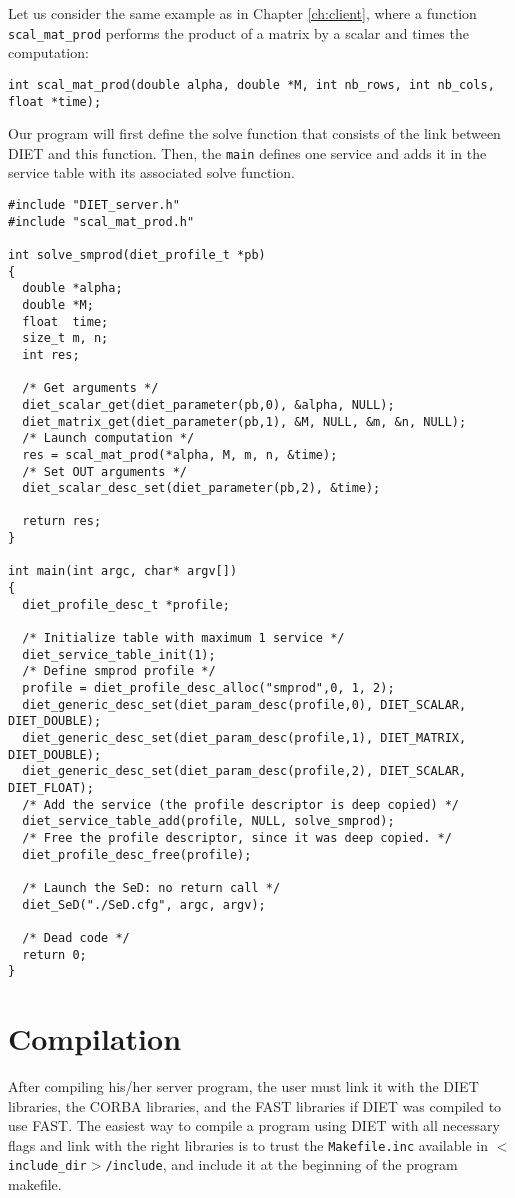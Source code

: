 {{Let us consider the same example as in Chapter \ref{ch:client}, where
a function \texttt{scal\_mat\_prod} performs the product of a matrix
by a scalar and times the computation: {\footnotesize
\begin{verbatim}
int scal_mat_prod(double alpha, double *M, int nb_rows, int nb_cols, float *time);
\end{verbatim}
}
Our program will first define the solve function that consists of the link
between DIET and this function. Then, the \texttt{main} defines one service and
adds it in the service table with its associated solve function.
{\footnotesize
\begin{verbatim}
#include "DIET_server.h"
#include "scal_mat_prod.h"

int solve_smprod(diet_profile_t *pb)
{
  double *alpha;
  double *M;
  float  time;
  size_t m, n;
  int res;

  /* Get arguments */
  diet_scalar_get(diet_parameter(pb,0), &alpha, NULL);
  diet_matrix_get(diet_parameter(pb,1), &M, NULL, &m, &n, NULL);
  /* Launch computation */
  res = scal_mat_prod(*alpha, M, m, n, &time);
  /* Set OUT arguments */
  diet_scalar_desc_set(diet_parameter(pb,2), &time);

  return res;
}

int main(int argc, char* argv[])
{
  diet_profile_desc_t *profile;
  
  /* Initialize table with maximum 1 service */
  diet_service_table_init(1);
  /* Define smprod profile */
  profile = diet_profile_desc_alloc("smprod",0, 1, 2);
  diet_generic_desc_set(diet_param_desc(profile,0), DIET_SCALAR, DIET_DOUBLE);
  diet_generic_desc_set(diet_param_desc(profile,1), DIET_MATRIX, DIET_DOUBLE);
  diet_generic_desc_set(diet_param_desc(profile,2), DIET_SCALAR, DIET_FLOAT);
  /* Add the service (the profile descriptor is deep copied) */
  diet_service_table_add(profile, NULL, solve_smprod);
  /* Free the profile descriptor, since it was deep copied. */
  diet_profile_desc_free(profile);

  /* Launch the SeD: no return call */
  diet_SeD("./SeD.cfg", argc, argv);

  /* Dead code */
  return 0;
}
\end{verbatim}
}


\section{Compilation}
\label{sec:sv_comp}


After compiling his/her server program, the user must link it with the DIET
libraries, the CORBA libraries, and the FAST libraries if DIET was compiled to
use FAST. The easiest way to compile a program using DIET with all
necessary flags and link with the right libraries is to trust the
\texttt{Makefile.inc} available in \texttt{$<$include\_dir$>$/include}, and
include it at the beginning of the program makefile.

}}
